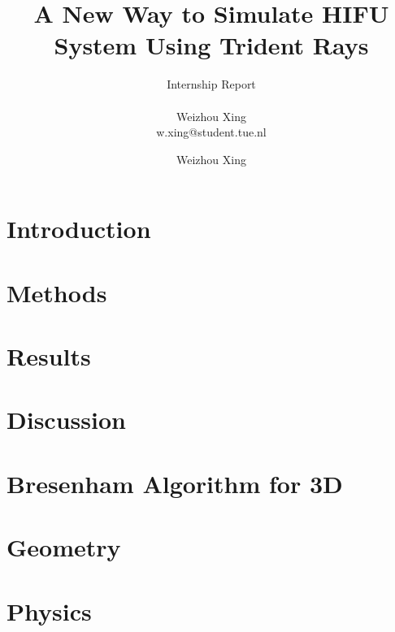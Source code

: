 \documentclass[12pt,a4paper]{report}
\title{A New Way to Simulate HIFU System Using Trident Rays}
\subtitle{Internship Report \\~\\ \small{Weizhou Xing \\ \small{w.xing@student.tue.nl}}}
\author{Weizhou Xing}
\begin{document}
\maketitle
\tableofcontents



\chapter{Introduction}


\chapter{Methods}


\chapter{Results}


\chapter{Discussion}


\begin{appendices}
\chapter{Bresenham Algorithm for 3D}

\chapter{Geometry}

\chapter{Physics}

\end{appendices}

\printbibliography[
heading=bibintoc,
title={References}
] %

\clearpage
\end{document}
